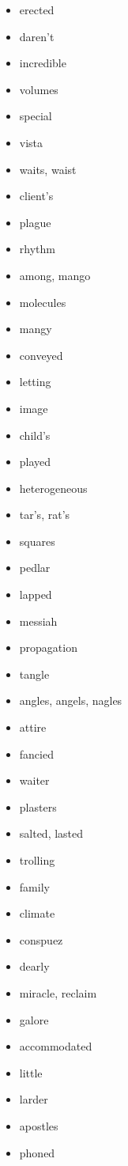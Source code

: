 \documentclass{article}
\begin{document}
\begin{itemize}
    \item erected
    \item daren't
    \item incredible
    \item volumes
    \item special
    \item vista
    \item waits, waist
    \item client's
    \item plague
    \item rhythm
    \item among, mango
    \item molecules
    \item mangy
    \item conveyed
    \item letting
    \item image
    \item child's
    \item played
    \item heterogeneous
    \item tar's, rat's
    \item squares
    \item pedlar
    \item lapped
    \item messiah
    \item propagation
    \item tangle
    \item angles, angels, nagles
    \item attire
    \item fancied
    \item waiter
    \item plasters
    \item salted, lasted
    \item trolling
    \item family
    \item climate
    \item conspuez
    \item dearly
    \item miracle, reclaim
    \item galore
    \item accommodated
    \item little
    \item larder
    \item apostles
    \item phoned

\end{itemize}
\end{document}
